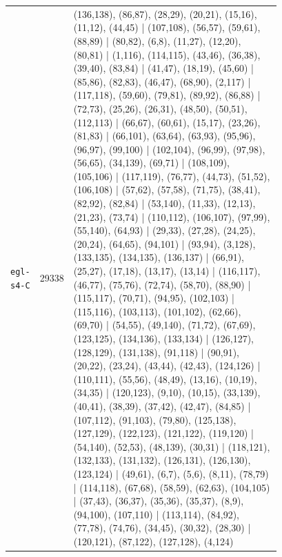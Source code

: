 \begin{landscape}
\begin{longtable}{lr>{\tiny\raggedright\arraybackslash}p{0.78\linewidth}}
\texttt{egl-s4-C} & 29338 & (136,138), (86,87), (28,29), (20,21), (15,16), (11,12), (44,45) | (107,108), (56,57), (59,61), (88,89) | (80,82), (6,8), (11,27), (12,20), (80,81) | (1,116), (114,115), (43,46), (36,38), (39,40), (83,84) | (41,47), (18,19), (45,60) | (85,86), (82,83), (46,47), (68,90), (2,117) | (117,118), (59,60), (79,81), (89,92), (86,88) | (72,73), (25,26), (26,31), (48,50), (50,51), (112,113) | (66,67), (60,61), (15,17), (23,26), (81,83) | (66,101), (63,64), (63,93), (95,96), (96,97), (99,100) | (102,104), (96,99), (97,98), (56,65), (34,139), (69,71) | (108,109), (105,106) | (117,119), (76,77), (44,73), (51,52), (106,108) | (57,62), (57,58), (71,75), (38,41), (82,92), (82,84) | (53,140), (11,33), (12,13), (21,23), (73,74) | (110,112), (106,107), (97,99), (55,140), (64,93) | (29,33), (27,28), (24,25), (20,24), (64,65), (94,101) | (93,94), (3,128), (133,135), (134,135), (136,137) | (66,91), (25,27), (17,18), (13,17), (13,14) | (116,117), (46,77), (75,76), (72,74), (58,70), (88,90) | (115,117), (70,71), (94,95), (102,103) | (115,116), (103,113), (101,102), (62,66), (69,70) | (54,55), (49,140), (71,72), (67,69), (123,125), (134,136), (133,134) | (126,127), (128,129), (131,138), (91,118) | (90,91), (20,22), (23,24), (43,44), (42,43), (124,126) | (110,111), (55,56), (48,49), (13,16), (10,19), (34,35) | (120,123), (9,10), (10,15), (33,139), (40,41), (38,39), (37,42), (42,47), (84,85) | (107,112), (91,103), (79,80), (125,138), (127,129), (122,123), (121,122), (119,120) | (54,140), (52,53), (48,139), (30,31) | (118,121), (132,133), (131,132), (126,131), (126,130), (123,124) | (49,61), (6,7), (5,6), (8,11), (78,79) | (114,118), (67,68), (58,59), (62,63), (104,105) | (37,43), (36,37), (35,36), (35,37), (8,9), (94,100), (107,110) | (113,114), (84,92), (77,78), (74,76), (34,45), (30,32), (28,30) | (120,121), (87,122), (127,128), (4,124) \\[2pt]
\end{longtable}
\endgroup
\end{landscape}
\restoregeometry